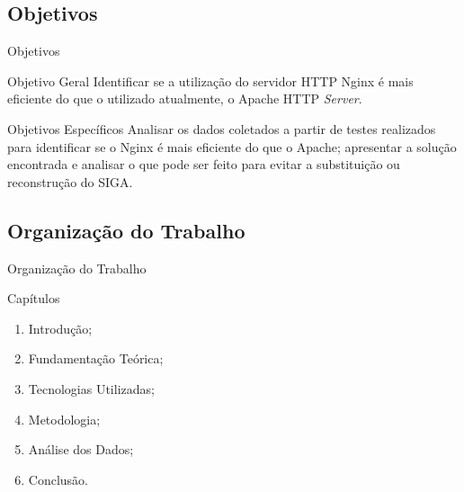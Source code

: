 \subsection{Objetivos}
\begin{frame}{Objetivos}
	\begin{block}{Objetivo Geral}
		Identificar se a utilização do servidor HTTP Nginx é mais eficiente do 
		que o utilizado atualmente, o Apache HTTP \textit{Server}.
	\end{block} \pause
	\begin{block}{Objetivos Específicos}
		Analisar os dados coletados a partir de testes realizados para 
		identificar se o Nginx é mais eficiente do que o Apache; apresentar a 
		solução encontrada e analisar o que pode ser feito para evitar a 
		substituição ou reconstrução do SIGA.
	\end{block}
\end{frame}

\subsection{Organização do Trabalho}

\begin{frame}{Organização do Trabalho}
	\begin{block}{Capítulos}
		\begin{enumerate}
			\item Introdução;
			\item Fundamentação Teórica;
			\item Tecnologias Utilizadas;
			\item Metodologia;
			\item Análise dos Dados;
			\item Conclusão.
		\end{enumerate}
	\end{block}
\end{frame}